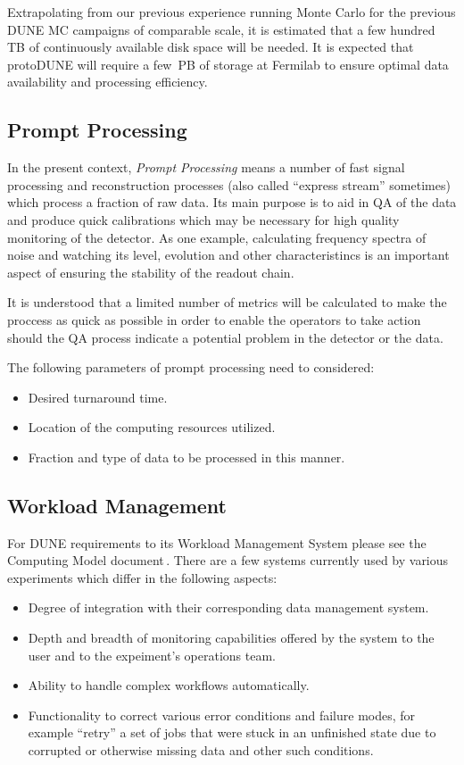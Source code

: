 Extrapolating from our previous experience running Monte Carlo for the previous DUNE MC campaigns of comparable scale,
it is estimated that  a few hundred TB of continuously available disk space will be needed. It is expected that protoDUNE will require
a few~PB of storage at Fermilab to ensure optimal data availability and  processing efficiency. 

\subsection{Prompt Processing}
In the present context, \textit{Prompt Processing} means a number of fast signal processing and reconstruction processes
(also called ``express stream'' sometimes) which process a fraction of raw data. Its main purpose is to aid in QA of the data
and produce quick calibrations which may be necessary for high quality monitoring of the detector. As one example,
calculating frequency spectra of noise and watching its level, evolution and other characteristincs is an important aspect of ensuring
the stability of the readout chain.

It is understood
that a limited number of metrics will be calculated to make the proccess as quick as possible in order to enable
the operators to take action should the QA process indicate a potential problem in the detector or the data.

The following parameters of prompt processing need to considered:
\begin{itemize}
\item Desired turnaround time.
\item Location of the computing resources utilized.
\item Fraction and type of data to be processed in this manner.
\end{itemize}

\subsection{Workload Management}
\label{sec:dune-wms}
For DUNE requirements to its Workload Management System please see the Computing Model document\,\cite{dune_computing_model}.
There are a few systems currently used by various experiments which
differ in the following aspects:
\begin{itemize}

\item Degree of integration with their corresponding data management system.

\item Depth and breadth of monitoring capabilities offered by the system to the user and to the expeiment's operations team.

\item Ability to handle complex workflows automatically.

\item Functionality to correct various error conditions and failure modes, for example ``retry'' a set of jobs that were stuck in an unfinished state
due to corrupted or otherwise missing data and other such conditions.

\end{itemize}

